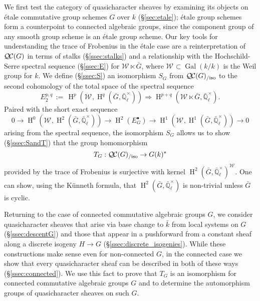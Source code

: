 \documentclass[CM,Submssn,SecEq]{degruyter-crelle} %
\theoremstyle{plain}
\theoremstyle{definition}
\theoremstyle{remark}
\newcommand{\EE}{\mathbb{\bar Q}_\ell}
\newcommand{\bFq}{\bar{k}}
\newcommand{\Fq}{k}
\newcommand{\EEx}{\EE^\times}
\newcommand{\Weil}[1]{\mathcal{W}_{#1}}
\DeclareMathOperator{\Gal}{Gal}
\DeclareMathOperator{\Hom}{Hom}
\DeclareMathOperator{\Hh}{H}
\newcommand{\ceq}{{\, :=\, }}
\newcommand{\TrFrob}[1]{T_{#1}}
\newcommand{\gqcs}[1]{{\mathcal{\bar #1}}}
\newcommand{\QC}{{\mathcal{Q\hskip-0.8pt C}}}
\newcommand{\QCiso}[1]{\QC(#1)_{/\text{iso}}}
\newcommand{\bG}{\bar{G}}
\begin{document}
We first test the category of quasicharacter sheaves by examining its objects on \'etale commutative group schemes $G$ over $\Fq$ (\S\ref{sec:etale});
\'etale group schemes form a counterpoint to connected algebraic groups, since the component group of any smooth group scheme is an \'etale group scheme.
Our key tools for understanding the trace of Frobenius in the \'etale case are a reinterpretation of $\QC(G)$ in terms of stalks (\S\ref{ssec:stalks}) and a
relationship with the Hochschild-Serre spectral sequence (\S\ref{ssec:E}) for $\Weil{} \ltimes \bG$, where $\Weil{} \subset \Gal(\Fq/\Fq)$ is the Weil group for $\Fq$.
We define (\S\ref{ssec:S}) an isomorphism $S_G$ from $\QCiso{G}$ to the second cohomology of the total space of the spectral sequence
\[
E_2^{p,q} \ceq \Hh^p(\Weil{}, \Hh^q(\bG, \EEx)) \Rightarrow \Hh^{p+q}(\Weil{} \ltimes \bG, \EEx).
\]
Paired with the short exact sequence
\[
  0 \to \Hh^0(\Weil{},\Hh^2({\bar G},\EEx)) \to \Hh^2(E^\bullet_G) \to \Hh^1(\Weil{},\Hh^1({\bar G},\EEx)) \to 0
\]
arising from the spectral sequence, the isomorphism $S_G$ allows us to show (\S\ref{ssec:SandT}) that 
the group homomorphism 
\[
\TrFrob{G}: \QCiso{G} \to G(\Fq)^*
\]
provided by the trace of Frobenius is surjective with kernel $\Hh^2(\bG,\EEx)^{\Weil{}}$.
One can show, using the K\"unneth formula, that $\Hh^2(\bG,\EEx)$ is non-trivial unless $\bG$ is cyclic.

Returning to the case of connected commutative algebraic groups $G$, we consider quasicharacter sheaves that arise via base change to $\bFq$ from local systems on $G$ (\S\ref{ssec:descentG}) and
those that appear in a pushforward from a constant sheaf along a discrete isogeny $H \to G$ (\S\ref{ssec:discrete_isogenies}).  While these constructions make sense even for non-connected $G$, in the connected
case we show that every quasicharacter sheaf can be described in both of these ways (\S\ref{ssec:connected}).  We use this fact to prove that $\TrFrob{G}$ is an isomorphism for connected commutative algebraic groups $G$
and to determine the automorphism groups of quasicharacter sheaves on such $G$.

%
\end{document}
